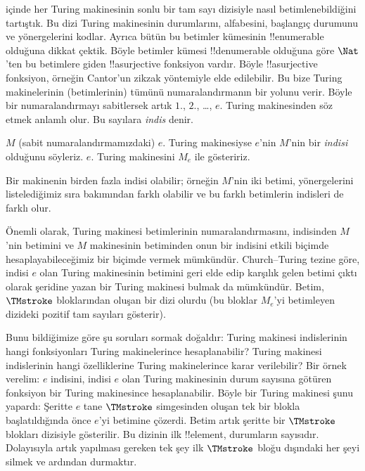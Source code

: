 \documentclass[../../../include/open-logic-section]{subfiles}
\begin{document}

 içinde her Turing makinesinin sonlu bir tam sayı dizisiyle
nasıl betimlenebildiğini tartıştık. Bu dizi Turing makinesinin durumlarını,
alfabesini, başlangıç durumunu ve yönergelerini kodlar. Ayrıca bütün bu
betimler kümesinin !!{enumerable} olduğuna dikkat çektik. Böyle betimler
kümesi !!{denumerable} olduğuna göre $\Nat$'ten bu betimlere giden
!!a{surjective} fonksiyon vardır. Böyle !!a{surjective} fonksiyon, örneğin
Cantor'un zikzak yöntemiyle elde edilebilir. Bu bize Turing makinelerinin
(betimlerinin) tümünü numaralandırmanın bir yolunu verir. Böyle bir
numaralandırmayı sabitlersek artık $1$., $2$., \dots, $e$. Turing
makinesinden söz etmek anlamlı olur. Bu sayılara \emph{indis} denir.

\begin{defn}
$M$ (sabit numaralandırmamızdaki) $e$. Turing makinesiyse $e$'nin $M$'nin bir
\emph{indisi} olduğunu söyleriz. $e$. Turing makinesini $M_e$ ile gösteririz.
\end{defn}

Bir makinenin birden fazla indisi olabilir; örneğin $M$'nin iki betimi,
yönergelerini listelediğimiz sıra bakımından farklı olabilir ve bu farklı
betimlerin indisleri de farklı olur.

Önemli olarak, Turing makinesi betimlerinin numaralandırmasını, indisinden
$M$'nin betimini ve $M$ makinesinin betiminden onun bir indisini etkili
biçimde hesaplayabileceğimiz bir biçimde vermek mümkündür. Church--Turing
tezine göre, indisi $e$ olan Turing makinesinin betimini geri elde edip karşılık
gelen betimi çıktı olarak şeridine yazan bir Turing makinesi bulmak da
mümkündür. Betim, $\TMstroke$ bloklarından oluşan bir dizi olurdu (bu bloklar
$M_e$'yi betimleyen dizideki pozitif tam sayıları gösterir).

Bunu bildiğimize göre şu soruları sormak doğaldır: Turing makinesi
indislerinin hangi fonksiyonları Turing makinelerince hesaplanabilir? Turing
makinesi indislerinin hangi özelliklerine Turing makinelerince karar
verilebilir? Bir örnek verelim: $e$ indisini, indisi $e$ olan Turing
makinesinin durum sayısına götüren fonksiyon bir Turing makinesince
hesaplanabilir. Böyle bir Turing makinesi şunu yapardı: Şeritte $e$ tane
$\TMstroke$ simgesinden oluşan tek bir blokla başlatıldığında önce $e$'yi
betimine çözerdi. Betim artık şeritte bir $\TMstroke$ blokları dizisiyle
gösterilir. Bu dizinin ilk !!{element}, durumların sayısıdır. Dolayısıyla
artık yapılması gereken tek şey ilk $\TMstroke$ bloğu dışındaki her şeyi
silmek ve ardından durmaktır.
\end{document}
